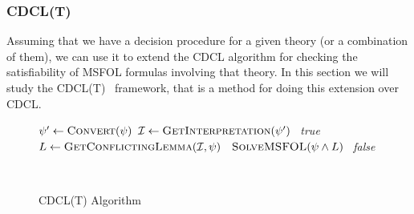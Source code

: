\subsubsection{CDCL(T)}

Assuming that we have a decision procedure for a given theory (or a combination of them), we can use it to extend the CDCL algorithm for checking the satisfiability of MSFOL formulas involving that theory. In this section we will study the CDCL(T)~\cite{cdcl_t} framework, that is a method for doing this extension over CDCL.\

\begin{figure}[t]
\begin{algorithmic}[1]
\State $\psi' \gets \Call{Convert}{\psi}$ 
  \State $\mathcal{I} \gets \Call{GetInterpretation}{\psi'}$
   
    \State~\Return \textit{true}
  \Else
    \State $L \gets \Call{GetConflictingLemma}{\mathcal{I}, \psi}$
    \State~\Return $\Call{SolveMSFOL}{\psi \wedge L}$
  \EndIf
\Else
  \State~\Return \textit{false}
\EndIf
\EndFunction
\end{algorithmic}
\caption{CDCL(T) Algorithm}~\label{cdclTAlgo}
\end{figure}

